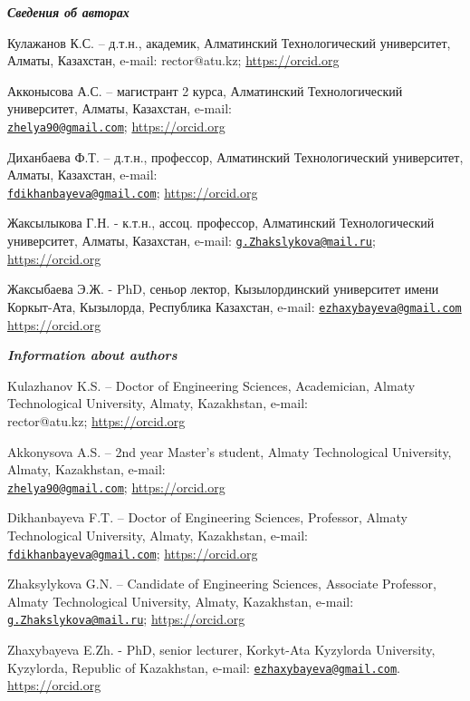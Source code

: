 \begin{authorinfo}
\emph{{\bfseries Сведения об авторах}}

Кулажанов К.С. -- д.т.н., академик, Алматинский Технологический
университет, Алматы, Казахстан, e-mail: rector@atu.kz;
\href{https://orcid.org/0000-0001-8984-0011}{https://orcid.org}

Акконысова А.С. -- магистрант 2 курса, Алматинский Технологический
университет, Алматы, Казахстан, e-mail:\\
\href{mailto:zhelya90@gmail.com}{\nolinkurl{zhelya90@gmail.com}};
\href{https://orcid.org/0009-0007-4390-1799}{https://orcid.org}

Диханбаева Ф.Т. -- д.т.н., профессор, Алматинский Технологический
университет, Алматы, Казахстан, e-mail:\\
\href{mailto:fdikhanbayeva@gmail.com}{\nolinkurl{fdikhanbayeva@gmail.com}};
\href{https://orcid.org/0000-0003-4257-3774}{https://orcid.org}

Жаксылыкова Г.Н. - к.т.н., ассоц. профессор, Алматинский Технологический
университет, Алматы, Казахстан, e-mail:
\href{mailto:g.Zhakslykova@mail.ru}{\nolinkurl{g.Zhakslykova@mail.ru}};
\href{https://orcid.org/0009-0008-8792-4834}{https://orcid.org}

Жаксыбаева Э.Ж. - PhD, сеньор лектор, Кызылординский университет имени
Коркыт-Ата, Кызылорда, Республика Казахстан, e-mail:
\href{mailto:ezhaxybayeva@gmail.com}{\nolinkurl{ezhaxybayeva@gmail.com}}
\href{https://orcid.org/0000-0002-0383-4946}{https://orcid.org}

\emph{{\bfseries Information about authors}}

Kulazhanov K.S. -- Doctor of Engineering Sciences, Academician, Almaty
Technological University, Almaty, Kazakhstan, e-mail:\\ rector@atu.kz;
\href{https://orcid.org/0000-0001-8984-0011}{https://orcid.org}

Akkonysova A.S. -- 2nd year Master's student, Almaty Technological
University, Almaty, Kazakhstan, e-mail:\\
\href{mailto:zhelya90@gmail.com}{\nolinkurl{zhelya90@gmail.com}};
\href{https://orcid.org/0009-0007-4390-1799}{https://orcid.org}

Dikhanbayeva F.T. -- Doctor of Engineering Sciences, Professor, Almaty
Technological University, Almaty, Kazakhstan, e-mail:
\href{mailto:fdikhanbayeva@gmail.com}{\nolinkurl{fdikhanbayeva@gmail.com}};
\href{https://orcid.org/0000-0003-4257-3774}{https://orcid.org}

Zhaksylykova G.N. -- Candidate of Engineering Sciences, Associate
Professor, Almaty Technological University, Almaty, Kazakhstan, e-mail:
\href{mailto:g.Zhakslykova@mail.ru}{\nolinkurl{g.Zhakslykova@mail.ru}};
\href{https://orcid.org/0009-0008-8792-4834}{https://orcid.org}

Zhaxybayeva E.Zh. - PhD, senior lecturer, Korkyt-Ata Kyzylorda
University, Kyzylorda, Republic of Kazakhstan, e-mail:
\href{mailto:ezhaxybayeva@gmail.com}{\nolinkurl{ezhaxybayeva@gmail.com}}.
\href{https://orcid.org/0000-0002-0383-4946}{https://orcid.org}
\end{authorinfo}
